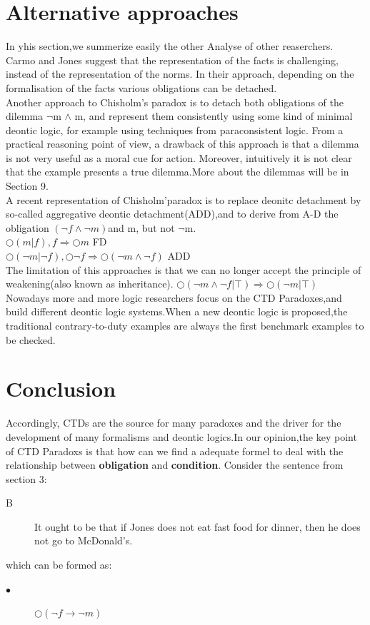 \documentclass{article}
\begin{document}
\section{Alternative approaches}
In yhis section,we summerize easily the other Analyse of other reaserchers.\\

  Carmo and Jones \cite{7} suggest that the representation of the facts is challenging,
instead of the representation of the norms. In their approach, depending on the
formalisation of the facts various obligations can be detached.\\
Another approach to Chisholm’s paradox is to detach both obligations of the
dilemma  $\neg$m $\wedge$ m, and represent them consistently using some kind of minimal deontic logic, for example using techniques from paraconsistent logic. From a practical reasoning point of view, a drawback of this approach is that a dilemma is not very useful as a moral cue for action. Moreover, intuitively it is not clear that the example presents a true dilemma.More about the dilemmas will be in Section 9.\\

A recent representation of Chisholm'paradox is to replace deonitc detachment by so-called aggregative deontic detachment(ADD),and to derive from A-D the obligation  $(\neg f \wedge \neg m)$and m, but not $\neg $m.\\
$\bigcirc (m|f),f \Rightarrow \bigcirc m $ FD\\
$\bigcirc(\neg m |\neg f),\bigcirc\neg f \Rightarrow \bigcirc(\neg m \wedge \neg f)$ ADD\\
The limitation of this approaches is that we can no longer accept the principle of weakening(also known as inheritance). 
$\bigcirc(\neg m \wedge\neg f|\top) \Rightarrow \bigcirc(\neg m |\top)$\\

Nowadays more and more logic researchers focus on the CTD Paradoxes,and build different deontic logic systems.When a new deontic logic is proposed,the traditional contrary-to-duty examples are always the first benchmark examples to be checked.

\section{Conclusion}
Accordingly, CTDs are the source for many paradoxes and the driver for the
development of many formalisms and deontic logics.In our opinion,the key point of CTD Paradoxs  is that how can we find a adequate formel to deal with the relationship between \textbf{obligation} and \textbf{condition}.
Consider the sentence from section 3:
\begin{description}
\item[B] It ought to be that if Jones does not eat fast food for dinner, then he does not go to McDonald’s.
\end{description}
which can be formed as:
\begin{description}
\item[$\bullet $]$\bigcirc (\neg f \rightarrow\neg m)$
\end{description}
\end{document}

